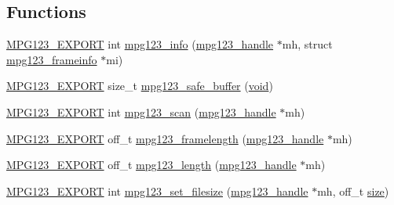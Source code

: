 \subsection*{Functions}
\begin{DoxyCompactItemize}
\item 
\mbox{\hyperlink{mpg123_8h_a2ba98cfba3f760879df70e755b2a61cc}{M\+P\+G123\+\_\+\+E\+X\+P\+O\+RT}} int \mbox{\hyperlink{group__mpg123__status_ga2f3357b968c78a77ad456a3200820ba8}{mpg123\+\_\+info}} (\mbox{\hyperlink{group__mpg123__init_ga6728e2839a395f3a07d4514da659faca}{mpg123\+\_\+handle}} $\ast$mh, struct \mbox{\hyperlink{structmpg123__frameinfo}{mpg123\+\_\+frameinfo}} $\ast$mi)
\item 
\mbox{\hyperlink{mpg123_8h_a2ba98cfba3f760879df70e755b2a61cc}{M\+P\+G123\+\_\+\+E\+X\+P\+O\+RT}} size\+\_\+t \mbox{\hyperlink{group__mpg123__status_gafdb7e99795ac9915f47d0e1985ce3968}{mpg123\+\_\+safe\+\_\+buffer}} (\mbox{\hyperlink{_s_d_l__opengles2__gl2ext_8h_ae5d8fa23ad07c48bb609509eae494c95}{void}})
\item 
\mbox{\hyperlink{mpg123_8h_a2ba98cfba3f760879df70e755b2a61cc}{M\+P\+G123\+\_\+\+E\+X\+P\+O\+RT}} int \mbox{\hyperlink{group__mpg123__status_ga229cf48b0e7020403e423824f6b9ac2c}{mpg123\+\_\+scan}} (\mbox{\hyperlink{group__mpg123__init_ga6728e2839a395f3a07d4514da659faca}{mpg123\+\_\+handle}} $\ast$mh)
\item 
\mbox{\hyperlink{mpg123_8h_a2ba98cfba3f760879df70e755b2a61cc}{M\+P\+G123\+\_\+\+E\+X\+P\+O\+RT}} off\+\_\+t \mbox{\hyperlink{group__mpg123__status_gabf4a6c8f3b251acfa05fd7737a076370}{mpg123\+\_\+framelength}} (\mbox{\hyperlink{group__mpg123__init_ga6728e2839a395f3a07d4514da659faca}{mpg123\+\_\+handle}} $\ast$mh)
\item 
\mbox{\hyperlink{mpg123_8h_a2ba98cfba3f760879df70e755b2a61cc}{M\+P\+G123\+\_\+\+E\+X\+P\+O\+RT}} off\+\_\+t \mbox{\hyperlink{group__mpg123__status_ga7a97295f5dd82795489d9ed8ee544805}{mpg123\+\_\+length}} (\mbox{\hyperlink{group__mpg123__init_ga6728e2839a395f3a07d4514da659faca}{mpg123\+\_\+handle}} $\ast$mh)
\item 
\mbox{\hyperlink{mpg123_8h_a2ba98cfba3f760879df70e755b2a61cc}{M\+P\+G123\+\_\+\+E\+X\+P\+O\+RT}} int \mbox{\hyperlink{group__mpg123__status_gad0301e80dbc3f48e47e27d39cd328755}{mpg123\+\_\+set\+\_\+filesize}} (\mbox{\hyperlink{group__mpg123__init_ga6728e2839a395f3a07d4514da659faca}{mpg123\+\_\+handle}} $\ast$mh, off\+\_\+t \mbox{\hyperlink{_s_d_l__opengl__glext_8h_a3d1e3edfcf61ca2d831883e1afbad89e}{size}})
\item 

\end{DoxyCompactItemize}
